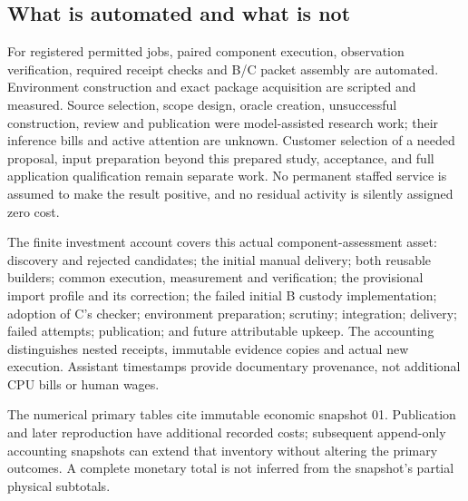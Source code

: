 \documentclass[11pt,a4paper]{article}
\begin{document}
\subsection{What is automated and what is not}

For registered permitted jobs, paired component execution, observation verification, required receipt checks and B/C packet assembly are automated. Environment construction and exact package acquisition are scripted and measured. Source selection, scope design, oracle creation, unsuccessful construction, review and publication were model-assisted research work; their inference bills and active attention are unknown. Customer selection of a needed proposal, input preparation beyond this prepared study, acceptance, and full application qualification remain separate work. No permanent staffed service is assumed to make the result positive, and no residual activity is silently assigned zero cost.\cite{economics,companion}

The finite investment account covers this actual component-assessment asset: discovery and rejected candidates; the initial manual delivery; both reusable builders; common execution, measurement and verification; the provisional import profile and its correction; the failed initial B custody implementation; adoption of C's checker; environment preparation; scrutiny; integration; delivery; failed attempts; publication; and future attributable upkeep. The accounting distinguishes nested receipts, immutable evidence copies and actual new execution. Assistant timestamps provide documentary provenance, not additional CPU bills or human wages.\cite{economics}

The numerical primary tables cite immutable economic snapshot 01. Publication and later reproduction have additional recorded costs; subsequent append-only accounting snapshots can extend that inventory without altering the primary outcomes. A complete monetary total is not inferred from the snapshot's partial physical subtotals.\cite{economicaudit}
\end{document}
